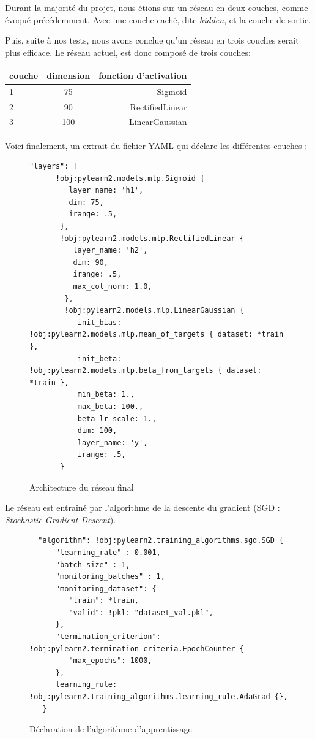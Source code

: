 \documentclass[12pt, a4paper]{article}
\begin{document}
Durant la majorité du projet, nous étions sur un réseau en deux couches, comme évoqué précédemment. Avec une couche caché, dite \emph{hidden}, et la couche de sortie. 

Puis, suite à nos tests, nous avons conclue qu'un réseau en trois couches serait plus efficace. Le réseau actuel, est donc composé de trois couches: 

\begin{center}
\begin{tabular}{|l|c|r|}
  \hline
  couche & dimension & fonction d'activation\\
  \hline
  1 & 75 & Sigmoid \\
  2 & 90 & RectifiedLinear \\
  3 & 100 & LinearGaussian \\
  \hline
\end{tabular}
\end{center}

Voici finalement, un extrait du fichier YAML qui déclare les différentes couches :

\begin{figure}[h!]
\begin{verbatim}
"layers": [
      !obj:pylearn2.models.mlp.Sigmoid {
         layer_name: 'h1',
         dim: 75,
         irange: .5,
       },
       !obj:pylearn2.models.mlp.RectifiedLinear {
          layer_name: 'h2',
          dim: 90,
          irange: .5,
          max_col_norm: 1.0,
        },
        !obj:pylearn2.models.mlp.LinearGaussian {
           init_bias: !obj:pylearn2.models.mlp.mean_of_targets { dataset: *train },
           init_beta: !obj:pylearn2.models.mlp.beta_from_targets { dataset: *train },
           min_beta: 1.,
           max_beta: 100.,
           beta_lr_scale: 1.,
           dim: 100,
           layer_name: 'y',
           irange: .5,
       }
\end{verbatim}
  \caption{Architecture du réseau final}
\end{figure}


Le réseau est entraîné par l'algorithme de la descente du gradient (SGD : \emph{Stochastic Gradient Descent}). 

\begin{figure}[h!]
\begin{verbatim}
  "algorithm": !obj:pylearn2.training_algorithms.sgd.SGD {
      "learning_rate" : 0.001,
      "batch_size" : 1,
      "monitoring_batches" : 1,
      "monitoring_dataset": {
         "train": *train,
         "valid": !pkl: "dataset_val.pkl",
      },
      "termination_criterion": !obj:pylearn2.termination_criteria.EpochCounter {
         "max_epochs": 1000,
      },
      learning_rule: !obj:pylearn2.training_algorithms.learning_rule.AdaGrad {},
   }
\end{verbatim}
  \caption{Déclaration de l'algorithme d'apprentissage}
\end{figure}
\end{document}
